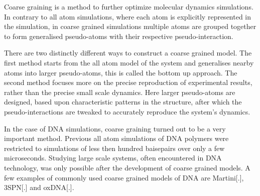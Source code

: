 Coarse graining is a method to further optimize molecular dynamics simulations.
In contrary to all atom simulations, where each atom is explicitly represented in the
simulation, in coarse grained simulations multiple atoms are grouped together to form
generalised pseudo-atoms with their respective pseudo-interaction.

There are two distinctly different ways to construct a coarse grained model. The first
method starts from the all atom model of the system and generalises nearby atoms into
larger pseudo-atoms, this is called the bottom up approach. The second method focuses
more on the precise reproduction of experimental results, rather than
the precise small scale dynamics. Here larger pseudo-atoms are designed, based upon
characteristic patterns in the structure, after which the pseudo-interactions are tweaked
to accurately reproduce the system's dynamics.

In the case of DNA simulations, coarse graining turned out to be a very important method.
Previous all atom simulations of DNA polymers were restricted to simulations of less then
hundred baisepairs over only a few microseconds. Studying large scale systems, often
encountered in DNA technology, was only possible after the development of coarse grained
models. A few examples of commonly used coarse grained models of DNA are Martini[.],
3SPN[.] and oxDNA[.].\\

